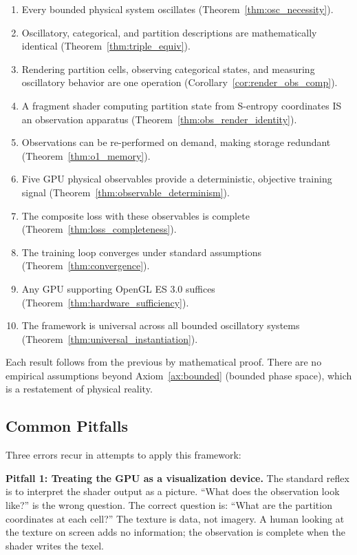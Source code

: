 \documentclass[11pt,twocolumn,a4paper]{article}
\theoremstyle{definition}
\theoremstyle{remark}
\begin{document}
\begin{enumerate}[nosep]
\item Every bounded physical system oscillates (Theorem~\ref{thm:osc_necessity}).
\item Oscillatory, categorical, and partition descriptions are mathematically identical (Theorem~\ref{thm:triple_equiv}).
\item Rendering partition cells, observing categorical states, and measuring oscillatory behavior are one operation (Corollary~\ref{cor:render_obs_comp}).
\item A fragment shader computing partition state from S-entropy coordinates IS an observation apparatus (Theorem~\ref{thm:obs_render_identity}).
\item Observations can be re-performed on demand, making storage redundant (Theorem~\ref{thm:o1_memory}).
\item Five GPU physical observables provide a deterministic, objective training signal (Theorem~\ref{thm:observable_determinism}).
\item The composite loss with these observables is complete (Theorem~\ref{thm:loss_completeness}).
\item The training loop converges under standard assumptions (Theorem~\ref{thm:convergence}).
\item Any GPU supporting OpenGL ES 3.0 suffices (Theorem~\ref{thm:hardware_sufficiency}).
\item The framework is universal across all bounded oscillatory systems (Theorem~\ref{thm:universal_instantiation}).
\end{enumerate}

Each result follows from the previous by mathematical proof. There are no empirical assumptions beyond Axiom~\ref{ax:bounded} (bounded phase space), which is a restatement of physical reality.

\subsection{Common Pitfalls}

Three errors recur in attempts to apply this framework:

\textbf{Pitfall 1: Treating the GPU as a visualization device.} The standard reflex is to interpret the shader output as a picture. ``What does the observation look like?'' is the wrong question. The correct question is: ``What are the partition coordinates at each cell?'' The texture is data, not imagery. A human looking at the texture on screen adds no information; the observation is complete when the shader writes the texel.
\end{document}
